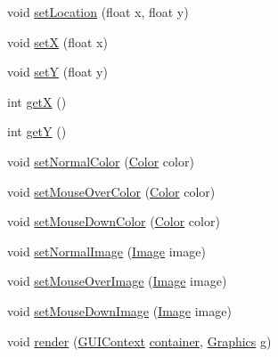\begin{DoxyCompactItemize}
\item 
void \mbox{\hyperlink{classorg_1_1newdawn_1_1slick_1_1gui_1_1_mouse_over_area_ac55408bd04c3aa272077524dd5cc8e25}{set\+Location}} (float x, float y)
\item 
void \mbox{\hyperlink{classorg_1_1newdawn_1_1slick_1_1gui_1_1_mouse_over_area_a63a8c3bbd8f8ce9ae7c0dcf75cb61240}{setX}} (float x)
\item 
void \mbox{\hyperlink{classorg_1_1newdawn_1_1slick_1_1gui_1_1_mouse_over_area_a008ab863c05dc791930c5aacda2dbb39}{setY}} (float y)
\item 
int \mbox{\hyperlink{classorg_1_1newdawn_1_1slick_1_1gui_1_1_mouse_over_area_a2856fed67e12db6016846dca42316ddd}{getX}} ()
\item 
int \mbox{\hyperlink{classorg_1_1newdawn_1_1slick_1_1gui_1_1_mouse_over_area_aee9e2876cba8a5468425f1a70a3c0487}{getY}} ()
\item 
void \mbox{\hyperlink{classorg_1_1newdawn_1_1slick_1_1gui_1_1_mouse_over_area_a64c31f0ec3a3b74d9d6f9645f670e7cc}{set\+Normal\+Color}} (\mbox{\hyperlink{classorg_1_1newdawn_1_1slick_1_1_color}{Color}} color)
\item 
void \mbox{\hyperlink{classorg_1_1newdawn_1_1slick_1_1gui_1_1_mouse_over_area_a119e40b4e9db8a0828d38b9d9da85ab7}{set\+Mouse\+Over\+Color}} (\mbox{\hyperlink{classorg_1_1newdawn_1_1slick_1_1_color}{Color}} color)
\item 
void \mbox{\hyperlink{classorg_1_1newdawn_1_1slick_1_1gui_1_1_mouse_over_area_ac720a48f34130519cd85a659522d0408}{set\+Mouse\+Down\+Color}} (\mbox{\hyperlink{classorg_1_1newdawn_1_1slick_1_1_color}{Color}} color)
\item 
void \mbox{\hyperlink{classorg_1_1newdawn_1_1slick_1_1gui_1_1_mouse_over_area_a2a71a564e81028fefd5c626d27d5494e}{set\+Normal\+Image}} (\mbox{\hyperlink{classorg_1_1newdawn_1_1slick_1_1_image}{Image}} image)
\item 
void \mbox{\hyperlink{classorg_1_1newdawn_1_1slick_1_1gui_1_1_mouse_over_area_ac698635f987336a7665fd8c88b228181}{set\+Mouse\+Over\+Image}} (\mbox{\hyperlink{classorg_1_1newdawn_1_1slick_1_1_image}{Image}} image)
\item 
void \mbox{\hyperlink{classorg_1_1newdawn_1_1slick_1_1gui_1_1_mouse_over_area_a5f2d322cd2b050590e1e836929b5052f}{set\+Mouse\+Down\+Image}} (\mbox{\hyperlink{classorg_1_1newdawn_1_1slick_1_1_image}{Image}} image)
\item 
void \mbox{\hyperlink{classorg_1_1newdawn_1_1slick_1_1gui_1_1_mouse_over_area_a37b442cacc81eec200efb0fa76d86fe0}{render}} (\mbox{\hyperlink{interfaceorg_1_1newdawn_1_1slick_1_1gui_1_1_g_u_i_context}{G\+U\+I\+Context}} \mbox{\hyperlink{classorg_1_1newdawn_1_1slick_1_1gui_1_1_abstract_component_af6d1abaa24da0b9a06fb153722e15435}{container}}, \mbox{\hyperlink{classorg_1_1newdawn_1_1slick_1_1_graphics}{Graphics}} g)

\end{DoxyCompactItemize}
